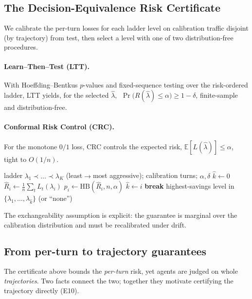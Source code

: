 \documentclass[11pt]{article}
\begin{document}
\subsection{The Decision-Equivalence Risk Certificate}
We calibrate the per-turn losses for each ladder level on calibration traffic
disjoint (by trajectory) from test, then select a level with one of two
distribution-free procedures.

\paragraph{Learn--Then--Test (LTT).} With Hoeffding--Bentkus $p$-values and
fixed-sequence testing over the risk-ordered ladder, LTT yields, for the selected
$\hat\lambda$, $\;\Pr\!\big(R(\hat\lambda)\le\alpha\big)\ge 1-\delta$, finite-sample
and distribution-free.
\paragraph{Conformal Risk Control (CRC).} For the monotone $0/1$ loss, CRC controls
the expected risk, $\mathbb{E}[L(\hat\lambda)]\le\alpha$, tight to $O(1/n)$.

\begin{algorithm}[t]
\caption{LTT certification over the compression ladder}
\label{alg:ltt}
\begin{algorithmic}[1]
\Require ladder $\lambda_1\!\prec\!\dots\!\prec\!\lambda_K$ (least$\to$most aggressive); calibration turns; $\alpha,\delta$
\State $\hat k \gets 0$
  \State $\hat R_i \gets \frac{1}{n}\sum_t L_t(\lambda_i)$ 
  \State $p_i \gets \mathrm{HB}(\hat R_i, n, \alpha)$ 
   $\hat k \gets i$ 
  \Else{} \textbf{break} 
  \EndIf
\EndFor
\State \Return highest-savings level in $\{\lambda_1,\dots,\lambda_{\hat k}\}$ (or ``none'')
\end{algorithmic}
\end{algorithm}

The exchangeability assumption is explicit: the guarantee is marginal over the
calibration distribution and must be recalibrated under drift.

\subsection{From per-turn to trajectory guarantees}
\label{sec:traj-theory}
The certificate above bounds the \emph{per-turn} risk, yet agents are judged on whole
\emph{trajectories}. Two facts connect the two; together they motivate certifying the
trajectory directly (E10).
\end{document}
